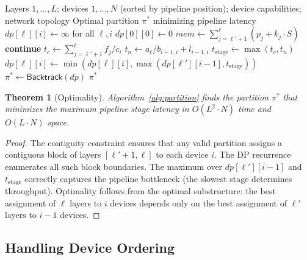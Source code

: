 \documentclass[11pt,a4paper]{article}
\newtheorem{theorem}{Theorem}
\begin{document}
\begin{algorithm}[H]
\caption{Optimal Pipeline Partitioning}
\label{alg:partition}
\begin{algorithmic}[1]
\Require Layers $1, \ldots, L$; devices $1, \ldots, N$ (sorted by pipeline position); device capabilities; network topology
\Ensure Optimal partition $\pi^*$ minimizing pipeline latency
\State $\mathit{dp}[\ell][i] \leftarrow \infty$ for all $\ell, i$ 
\State $\mathit{dp}[0][0] \leftarrow 0$
         
            \State $\mathit{mem} \leftarrow \sum_{j=\ell'+1}^{\ell} (p_j + k_j \cdot S)$
                \State \textbf{continue} 
            \EndIf
            \State $t_c \leftarrow \sum_{j=\ell'+1}^{\ell} f_j / c_i$ 
            \State $t_n \leftarrow a_\ell / b_{i-1, i} + l_{i-1, i}$ 
            \State $t_{\text{stage}} \leftarrow \max(t_c, t_n)$ 
            \State $\mathit{dp}[\ell][i] \leftarrow \min(\mathit{dp}[\ell][i], \max(\mathit{dp}[\ell'][i-1], t_{\text{stage}}))$
        \EndFor
    \EndFor
\EndFor
\State $\pi^* \leftarrow \mathsf{Backtrack}(\mathit{dp})$
\State \Return $\pi^*$
\end{algorithmic}
\end{algorithm}

\begin{theorem}[Optimality]
Algorithm~\ref{alg:partition} finds the partition $\pi^*$ that minimizes the maximum pipeline stage latency in $O(L^2 \cdot N)$ time and $O(L \cdot N)$ space.
\end{theorem}

\begin{proof}
The contiguity constraint ensures that any valid partition assigns a contiguous block of layers $[\ell'+1, \ell]$ to each device $i$. The DP recurrence enumerates all such block boundaries. The maximum over $\mathit{dp}[\ell'][i-1]$ and $t_{\text{stage}}$ correctly captures the pipeline bottleneck (the slowest stage determines throughput). Optimality follows from the optimal substructure: the best assignment of $\ell$ layers to $i$ devices depends only on the best assignment of $\ell'$ layers to $i-1$ devices.
\end{proof}

\subsection{Handling Device Ordering}
\end{document}
